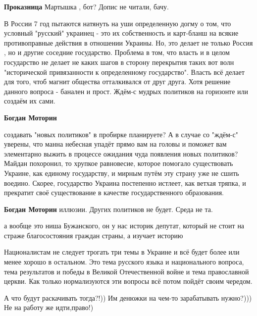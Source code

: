 \begin{itemize}
\begin{itemize}
\textbf{Проказница} Мартышка , бот?
Допис не читали, бачу.
\end{itemize} %


В России 7 год пытаются натянуть на уши определенную догму о том, что условный
"русский" украинец - это их собственность и карт-бланш на всякие противоправные
действия в отношении Украины. Но, это делает не только Россия , но и другие
соседние государство. Проблема в том, что власть и в целом государство не
делает не каких шагов в сторону перекрытия таких вот волн "исторической
привязанности к определенному государство". Власть всё делает для того, чтоб
магнит общества отталкивался от друг друга. Хотя решение данного вопроса -
банален и прост. Ждём-с мудрых политиков на горизонте или создаём их сами.

\begin{itemize} %
\textbf{Богдан Моторин} 

создавать "новых политиков" в пробирке планируете? А в случае со "ждём-с"
уверены, что манна небесная упадёт прямо вам на головы и поможет вам
элементарно выжить в процессе ожидания чуда появления новых политиков? Майдан
похоронил, то хрупкое равновесие, которое помогало существовать Украине, как
единому государству, и мирным путём эту страну уже не сшить воедино. Скорее,
государство Украина постепенно истлеет, как ветхая тряпка, и прекратит своё
существование в качестве государственного образования.


\textbf{Богдан Моторин} иллюзии. Других политиков не будет. Среда не та.
\end{itemize} %

а вообще это ниша Бужанского, он у нас историк депутат, который не стоит на страже благосостояния граждан страны, а изучает историю


Националистам не следует трогать три темы в Украине и всё будет более или менее
хорошо в остальном. Это тема русского языка и национального вопроса, тема
результатов и победы в Великой Отечественной войне и тема православной церкви.
Как только нормализуются эти вопросы всё потом пойдёт своим чередом.

\begin{itemize} %
А что будут раскачивать тогда?!)) Им денюжки на чем-то зарабатывать нужно?))) Не на работу же идти,право!)


\end{itemize}
\end{itemize}
